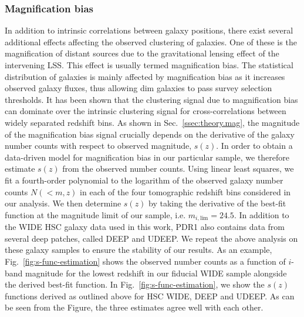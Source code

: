 \documentclass[a4paper,11pt]{article}
\begin{document}
    \subsubsection{Magnification bias}
      In addition to intrinsic correlations between galaxy positions, there exist several additional effects affecting the observed clustering of galaxies. One of these is the magnification of distant sources due to the gravitational lensing effect of the intervening LSS. This effect is usually termed magnification bias. The statistical distribution of galaxies is mainly affected by magnification bias as it increases observed galaxy fluxes, thus allowing dim galaxies to pass survey selection thresholds. It has been shown that the clustering signal due to magnification bias can dominate over the intrinsic clustering signal for cross-correlations between widely separated redshift bins. As shown in Sec.~\ref{ssec:theory.mag}, the magnitude of the magnification bias signal crucially depends on the derivative of the galaxy number counts with respect to observed magnitude, $s(z)$. In order to obtain a data-driven model for magnification bias in our particular sample, we therefore estimate $s(z)$ from the observed number counts. Using linear least squares, we fit a fourth-order polynomial to the logarithm of the observed galaxy number counts $N(<m, z)$ in each of the four tomographic redshift bins considered in our analysis. We then determine $s(z)$ by taking the derivative of the best-fit function at the magnitude limit of our sample, i.e. $m_{i, \mathrm{lim}} = 24.5$. In addition to the WIDE HSC galaxy data used in this work, PDR1 also contains data from several deep patches, called DEEP and UDEEP. We repeat the above analysis on these galaxy samples to ensure the stability of our results. As an example, Fig.~\ref{fig:s-func-estimation} shows the observed number counts as a function of $i$-band magnitude for the lowest redshift in our fiducial WIDE sample alongside the derived best-fit function. In Fig.~\ref{fig:s-func-estimation}, we show the $s(z)$ functions derived as outlined above for HSC WIDE, DEEP and UDEEP. As can be seen from the Figure, the three estimates agree well with each other.
\end{document}
